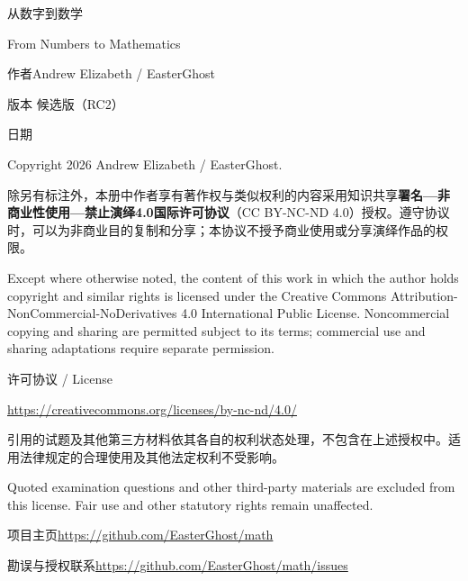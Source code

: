 \begingroup
\thispagestyle{empty}
\setlength{\parindent}{0pt}
\setlength{\parskip}{8pt}
\fontsize{10pt}{16pt}\selectfont
\vspace*{\fill}

{\heiti\fontsize{14pt}{20pt}\selectfont 从数字到数学\par}
From Numbers to Mathematics

作者\quad Andrew Elizabeth / EasterGhost\par
版本 候选版（RC2）\par
日期\quad \lecturenotesdate

Copyright \textcopyright{} 2026 Andrew Elizabeth / EasterGhost.

除另有标注外，本册中作者享有著作权与类似权利的内容采用知识共享\textbf{署名—非商业性使用—禁止演绎4.0国际许可协议}（CC BY-NC-ND 4.0）授权。遵守协议时，可以为非商业目的复制和分享；本协议不授予商业使用或分享演绎作品的权限。

Except where otherwise noted, the content of this work in which the author holds copyright and similar rights is licensed under the Creative Commons Attribution-NonCommercial-NoDerivatives 4.0 International Public License. Noncommercial copying and sharing are permitted subject to its terms; commercial use and sharing adaptations require separate permission.

许可协议 / License\par
\url{https://creativecommons.org/licenses/by-nc-nd/4.0/}

引用的试题及其他第三方材料依其各自的权利状态处理，不包含在上述授权中。适用法律规定的合理使用及其他法定权利不受影响。

Quoted examination questions and other third-party materials are excluded from this license. Fair use and other statutory rights remain unaffected.

项目主页\quad\url{https://github.com/EasterGhost/math}\par
勘误与授权联系\quad\url{https://github.com/EasterGhost/math/issues}

\endgroup
